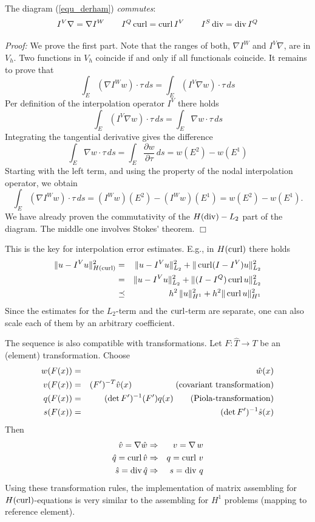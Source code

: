 \begin{theorem}
The diagram (\ref{equ_derham}) {\em commutes}:
$$
I^V \nabla = \nabla I^W \qquad
I^Q \operatorname{curl} = \operatorname{curl} I^V \qquad
I^S \operatorname{div} = \operatorname{div} I^Q
$$
\end{theorem}
{\em Proof:} We prove the first part. Note that the ranges of both,
$\nabla I^W$ and $I^V \nabla$, are in $V_h$. Two functions in $V_h$ coincide if
and only if all functionals coincide. It remains to prove that
$$
\int_E (\nabla I^W w) \cdot \tau \, ds = \int_E (I^V \nabla w)\cdot \tau \, ds
$$
Per definition of the interpolation operator $I^V$ there holds
$$
\int_E (I^V \nabla w)\cdot \tau \, ds = \int_E \nabla w \cdot \tau \, ds
$$
Integrating the tangential derivative gives the difference
$$
\int_E \nabla w \cdot \tau \, ds = \int_E \frac{\partial w}{\partial \tau} \, ds = w(E^2) - w(E^1)
$$
Starting with the left term, and using the property of the nodal interpolation operator,
we obtain
$$
\int_E (\nabla I^W w) \cdot \tau \, ds = (I^W w)(E^2) - (I^W w)(E^1) = w(E^2) - w(E^1).
$$
We have already proven the commutativity of the $H(\operatorname{div})-L_2$ part of the diagram.
The middle one involves Stokes\'{} theorem.
\hfill $\Box$


This is the key for interpolation error estimates. E.g., in $H(\operatorname{curl})$ there holds
\begin{eqnarray*}
\| u - I^V u \|_{H(\operatorname{curl})}^2 
& = & \| u - I^V u \|_{L_2}^2 + \| \operatorname{curl} (I-I^V) u \|_{L_2}^2 \\
& = & \| u - I^V u \|_{L_2}^2 + \| (I-I^Q) \operatorname{curl} u \|_{L_2}^2 \\
& \preceq & h^2 \, \| u \|_{H^1}^2 + h^2 \| \operatorname{curl} u \|_{H^1}^2 
\end{eqnarray*}
Since the estimates for the $L_2$-term and the $\operatorname{curl}$-term are separate, one can
also scale each of them by an arbitrary coefficient.

\bigskip

The sequence is also compatible with transformations. Let $F : \widehat T \rightarrow T$
be an (element) transformation. Choose
\begin{eqnarray*}
w(F(x)) & = & \hat w(x) \\
v(F(x)) & = & (F^\prime)^{-T} \hat v(x) \qquad \qquad \quad \, \mbox{(covariant transformation)}\\
q(F(x)) & = & (\operatorname{det}{F^\prime})^{-1} (F^\prime) q(x) \qquad \mbox{(Piola-transformation)} \\
s(F(x)) & = & (\operatorname{det}{F^\prime})^{-1} \hat s(x)
\end{eqnarray*}
Then 
\begin{eqnarray*}
\hat v = \nabla \hat w & \Rightarrow & v = \nabla  \, w \\
\hat q = \operatorname{curl} \hat v & \Rightarrow & q = \operatorname{curl} \, v \\
\hat s = \operatorname{div} \hat q & \Rightarrow & s = \operatorname{div} \, q
\end{eqnarray*}
Using these transformation rules, the implementation of matrix assembling for 
$H(\operatorname{curl})$-equations is very similar to the assembling for $H^1$ problems
(mapping to reference element).


